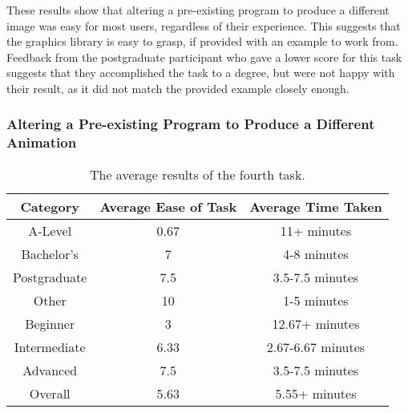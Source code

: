 \documentclass[../main.tex]{subfiles}
\begin{document}
                These results show that altering a pre-existing program to produce a different
                    image was easy for most users, regardless of their experience.
                This suggests that the graphics library is easy to grasp, if provided with an
                    example to work from.
                Feedback from the postgraduate participant who gave a lower score for this task
                    suggests that they accomplished the task to a degree, but were not happy with
                    their result, as it did not match the provided example closely enough.

            \subsubsection{Altering a Pre-existing Program to Produce a Different Animation}
                \begin{table}[H]
                    \centering
                    \begin{tabular}{c|c|c}
                        \textbf{Category} & \textbf{Average Ease of Task} & \textbf{Average Time Taken} \\
                        \hline
                        A-Level           & 0.67                          & 11+ minutes                 \\
                        Bachelor's        & 7                             & 4-8 minutes                 \\
                        Postgraduate      & 7.5                           & 3.5-7.5 minutes             \\
                        Other             & 10                            & 1-5 minutes                 \\
                        \hline
                        Beginner          & 3                             & 12.67+ minutes              \\
                        Intermediate      & 6.33                          & 2.67-6.67 minutes           \\
                        Advanced          & 7.5                           & 3.5-7.5 minutes             \\
                        \hline
                        Overall           & 5.63                          & 5.55+ minutes               \\
                    \end{tabular}
                    \caption{The average results of the fourth task.}
                \end{table}
\end{document}

